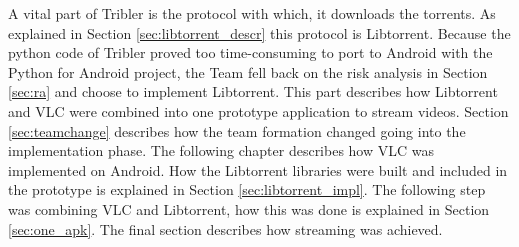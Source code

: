 A vital part of Tribler is the protocol with which, it downloads the torrents. As explained in Section \ref{sec:libtorrent_descr} this protocol is Libtorrent. Because the python code of Tribler proved too time-consuming to port to Android with the Python for Android project, the Team fell back on the risk analysis in Section \ref{sec:ra} and choose to implement Libtorrent. 
This part describes how Libtorrent and VLC were combined into one prototype application to stream videos. Section \ref{sec:teamchange} describes how the team formation changed going into the implementation phase. The following chapter describes how VLC was implemented on Android. How the Libtorrent libraries were built and included in the prototype is explained in Section \ref{sec:libtorrent_impl}. The following step was combining VLC and Libtorrent, how this was done is explained in Section \ref{sec:one_apk}. The final section describes how streaming was achieved.